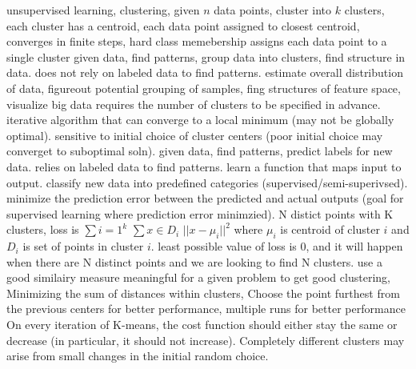 \documentclass[10pt]{article}
\begin{document}
\smallbreak
{} unsupervised learning, clustering, given $n$ data points, cluster into $k$ clusters, each cluster has a centroid, each data point assigned to closest centroid, converges in finite steps, hard class memebership assigns each data point to a single cluster
 given data, find patterns, group data into clusters, find structure in data. does not rely on labeled data to find patterns. estimate overall distribution of data, figureout potential grouping of samples, fing structures of feature space, visualize big data
\NEW    [k means] requires the number of clusters to be specified in advance. iterative algorithm that can converge to a local minimum (may not be globally optimal). sensitive to initial choice of cluster centers (poor initial choice may converget to suboptimal soln).
 given data, find patterns, predict labels for new data. relies on labeled data to find patterns. learn a function that maps input to output. classify new data into predefined categories (supervised/semi-superivsed). minimize the prediction error between the predicted and actual outputs (goal for supervised learning where prediction error minimzied).
\NEW    [loss] N distict points with K clusters, loss is $\sum{i=1}^k$ $\sum{x \in D_i}$ $||x-\mu_i||^2$ where $\mu_i$ is centroid of cluster $i$ and $D_i$ is set of points in cluster $i$. least possible value of loss is 0, and it will happen when there are N distinct points and we are looking to find N clusters.
\NEW    use a good similairy measure meaningful for a given problem to get good clustering, Minimizing the sum of distances within clusters, Choose the point furthest from the previous centers for better performance, multiple runs for better performance
\NEW    On every iteration of K-means, the cost function should either stay the same or decrease (in particular, it should not increase). Completely different clusters may arise from small changes in the initial random choice.
\end{document}
